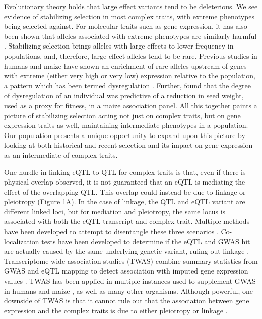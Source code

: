 \documentclass[article,9pt,twocolumn,twoside]{rilabRxiv}
\begin{document}
Evolutionary theory holds that large effect variants tend to be deleterious.
We see evidence of stabilizing selection in most complex traits, with extreme phenotypes being selected against.
For molecular traits such as gene expression, it has also been shown that alleles associated with extreme phenotypes are similarly harmful \citep{Zhao,Kremling2}.
Stabilizing selection brings alleles with large effects to lower frequency in populations, and, therefore, large effect alleles tend to be rare.
Previous studies in humans and maize have shown an enrichment of rare alleles upstream of genes with extreme (either very high or very low) expression relative to the population, a pattern which has been termed dysregulation \citep{Zhao,Kremling2}.
Further, \cite{Kremling2} found that the degree of dysregulation of an individual was predictive of a reduction in seed weight, used as a proxy for fitness, in a maize association panel.
All this together paints a picture of stabilizing selection acting not just on complex traits, but on gene expression traits as well, maintaining intermediate phenotypes in a population.
Our population presents a unique opportunity to expand upon this picture by looking at both historical and recent selection and its impact on gene expression as an intermediate of complex traits.
\par
One hurdle in linking eQTL to QTL for complex traits is that, even if there is physical overlap observed, it is not guaranteed that an eQTL is mediating the effect of the overlapping QTL.
This overlap could instead be due to linkage or pleiotropy (\hyperref[fig:scenarios]{Figure 1A})\citep{Yao}.
In the case of linkage, the QTL and eQTL variant are different linked loci, but for mediation and pleiotropy, the same locus is associated with both the eQTL transcript and complex trait.
Multiple methods have been developed to attempt to disentangle these three scenarios \citep{Porcu,Zhu}.
Co-localization tests have been developed to determine if the eQTL and GWAS hit are actually caused by the same underlying genetic variant, ruling out linkage \citep{Hormozdiari}.
Transcriptome-wide association studies (TWAS) combine summary statistics from GWAS and eQTL mapping to detect association with imputed gene expression values \citep{LiRitchie}.
TWAS has been applied in multiple instances used to supplement GWAS in humans \citep{Gusev2} and maize \citep{Kremling}, as well as many other organisms.
Although powerful, one downside of TWAS is that it cannot rule out that the association between gene expression and the complex traits is due to either pleiotropy or linkage \citep{Yao}.
\end{document}
